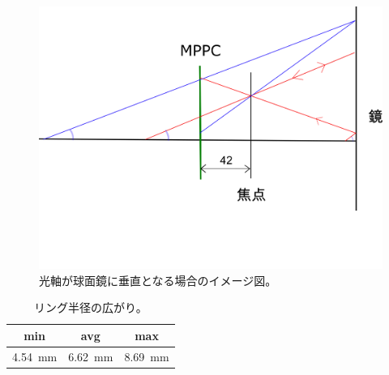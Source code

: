 \documentclass[uplatex, titlepage, dvipdfmx, 12pt, a4paper]{jsreport}
\begin{document}
    \begin{figure}[hbtp]
      \begin{center} 
        \includegraphics[scale=1, clip]{image/optical_system.png}
        \caption{光軸が球面鏡に垂直となる場合のイメージ図。} 
        \label{fig:optical_system} 
      \end{center}
    \end{figure}
    \begin{table}[hbtp]
      \begin{center}
        \label{tab:radius}
        \caption{リング半径の広がり。}
        \begin{tabular}{|c|c|c|}\hline
          min & avg & max\\ \hline
          \SI{4.54}{mm} & \SI{6.62}{mm} & \SI{8.69}{mm}\\ \hline
        \end{tabular}
      \end{center}
    \end{table}
\end{document}
